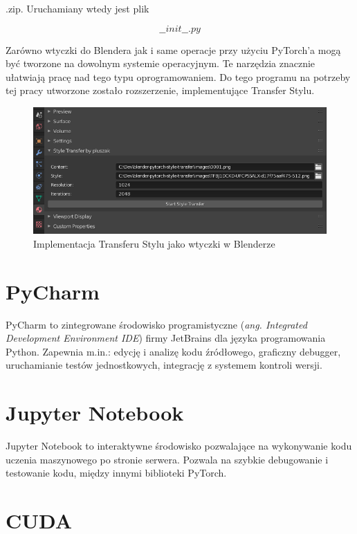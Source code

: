 \documentclass[brudnopis]{xmgr}
\begin{document}
.zip. Uruchamiany wtedy jest plik 

\begin{equation}
\_\_init\_\_.py
\end{equation}


Zarówno wtyczki do Blendera jak i same operacje przy użyciu PyTorch’a mogą być tworzone na dowolnym systemie operacyjnym. Te narzędzia znacznie ułatwiają pracę nad tego typu oprogramowaniem.
 Do tego programu na potrzeby tej pracy utworzone zostało rozszerzenie, implementujące Transfer Stylu. 

\begin{figure}[!tbh]
\centering
\includegraphics[width=.8\hsize]{fig/9}
\caption{Implementacja Transferu Stylu jako wtyczki w Blenderze\label{RYS.9}}
\end{figure}

\section{PyCharm\label{s:dsssl}}
 PyCharm to zintegrowane środowisko programistyczne (\textit{ang. Integrated Development Environment IDE}) firmy JetBrains dla języka programowania Python. Zapewnia m.in.: edycję i analizę kodu źródłowego, graficzny debugger, uruchamianie testów jednostkowych, integrację z systemem kontroli wersji. 
 
 \section{Jupyter Notebook\label{s:dsssl}}
 
Jupyter Notebook to interaktywne środowisko pozwalające na wykonywanie kodu uczenia maszynowego po stronie serwera. Pozwala na szybkie debugowanie i testowanie kodu, między innymi biblioteki PyTorch.

 \section{CUDA\label{s:dsssl}}
 
\end{document}
